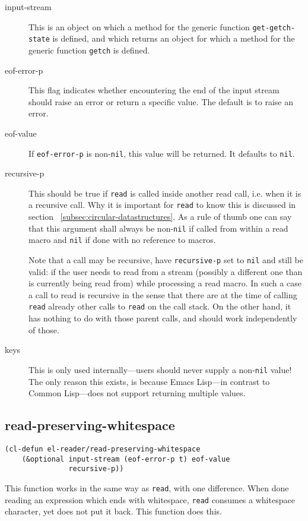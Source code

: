 \documentclass[a4paper,10pt,twoside]{report}
\newcommand{\el}{Emacs Lisp}
\newcommand{\cl}{Common Lisp}
\newcommand{\sym}[1]{\texttt{#1}}
\newcommand{\fun}[1]{\texttt{#1}}
\newcommand{\Read}{\fun{read}}
\newcommand{\nil}{\sym{nil}}
\begin{document}
\begin{description}
\item[input-stream] This is an object on which a method for the generic function
  \fun{get-getch-state} is defined, and which returns an object for which a
  method for the generic function \fun{getch} is defined.
\item[eof-error-p] This flag indicates whether encountering the end of the input
  stream should raise an error or return a specific value.  The default is to
  raise an error. 
\item[eof-value] If \sym{eof-error-p} is non-\nil{}, this value will be
  returned.  It defaults to \nil{}.
\item[recursive-p] This should be true if \Read{} is called inside another read
  call, i.e. when it is a recursive call.  Why it is important for \Read{} to
  know this is discussed in section ~\ref{subsec:circular-datastructures}.  As a
  rule of thumb one can say that this argument shall always be non-\nil{} if
  called from within a read macro and \nil{} if done with no reference to
  macros.

  Note that a call may be recursive, have \sym{recursive-p} set to \nil{} and
  still be valid: if the user needs to read from a stream (possibly a different
  one than is currently being read from) while processing a read macro.  In such
  a case a call to read is recursive in the sense that there are at the time of
  calling \Read{} already other calls to \Read{} on the call stack.  On the
  other hand, it has nothing to do with those parent calls, and should work
  independently of those.
\item[keys] This is only used internally---users should never supply a
  non-\nil{} value!  The only reason this exists, is because \el{}---in contrast
  to \cl{}---does not support returning multiple values.
\end{description}

\subsection{read-preserving-whitespace}
\label{subsec:read-preserving-whitespace}

\begin{lstlisting}[style=lispinline]
(cl-defun el-reader/read-preserving-whitespace
    (&optional input-stream (eof-error-p t) eof-value
               recursive-p))
\end{lstlisting}

This function works in the same way as \Read{}, with one difference.  When done
reading an expression which ends with whitespace, \Read{} consumes a whitespace
character, yet does not put it back.  This function does this.
\end{document}
